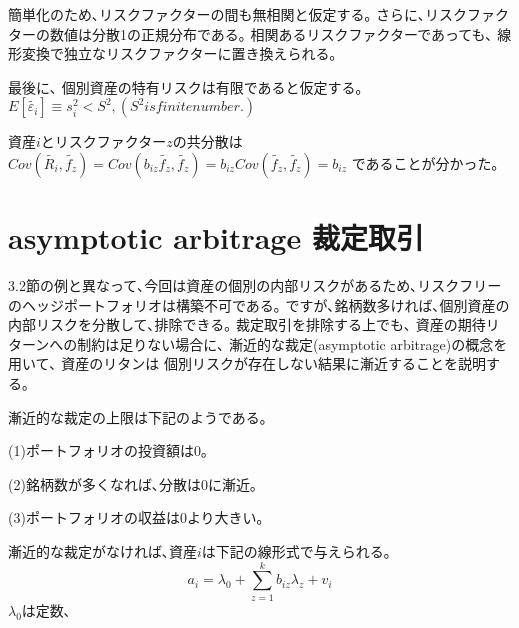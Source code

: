 \documentclass[uplatex,a4paper]{jsarticle}
\begin{document}
簡単化のため､リスクファクターの間も無相関と仮定する｡
さらに､リスクファクターの数値は分散1の正規分布である｡
{\color{red}相関あるリスクファクターであっても､ 線形変換で独立なリスクファクターに置き換えられる｡}

最後に､
個別資産の特有リスクは有限であると仮定する｡
$
E[\tilde{\varepsilon_i}]\equiv s_i^2 < S^2, (S^2 is finite number.)
$

資産$i$とリスクファクター$z$の共分散は
$
Cov(\tilde{R_i},\tilde{f_z}) = Cov(b_{iz} \tilde{f_z}, \tilde{f_z}) = b_{iz} Cov(\tilde{f_z}, \tilde{f_z}) = b_{iz}
$
であることが分かった｡

\section{asymptotic arbitrage  裁定取引}

3.2節の例と異なって､今回は資産の個別の内部リスクがあるため､リスクフリーのヘッジポートフォリオは構築不可である｡
ですが､銘柄数多ければ､個別資産の内部リスクを分散して､排除できる｡
{\color{red}裁定取引を排除する上でも､ 資産の期待リターンへの制約は足りない場合に､
漸近的な裁定(asymptotic arbitrage)の概念を用いて､ 資産のリタンは 個別リスクが存在しない結果に漸近することを説明する｡
}

漸近的な裁定の上限は下記のようである｡

(1)ポートフォリオの投資額は0｡

(2)銘柄数が多くなれば､分散は0に漸近｡

(3)ポートフォリオの収益は0より大きい｡


漸近的な裁定がなければ､資産$i$は下記の線形式で与えられる｡
$$
a_i = \lambda_0 + \sum_{z=1}^{k} b_{iz} \lambda_z + v_i
$$
$\lambda_0$は定数､
\end{document}
